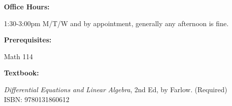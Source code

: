 \documentclass{article}
\theoremstyle{plain}
\theoremstyle{definition}
\theoremstyle{remark}
\begin{document}
\vskip0.1in \noindent
\begin{minipage}[t]{1.2in}
	\textbf{Office Hours:}
\end{minipage}
\begin{minipage}[t]{5.3in}
	1:30-3:00pm M/T/W and by appointment, generally any afternoon is fine.
\end{minipage}

\vskip0.1in \noindent
\begin{minipage}[t]{1.2in}
	\textbf{Prerequisites:}
\end{minipage}
\begin{minipage}[t]{5.3in}
	Math 114
\end{minipage}


\vskip0.1in \noindent
\begin{minipage}[t]{1.2in}
	\textbf{Textbook:}
\end{minipage}
\begin{minipage}[t]{5.3in} 
	\emph{Differential Equations and Linear Algebra}, 2nd Ed, by Farlow.   (Required)\\
ISBN: 9780131860612
\end{minipage}


\end{document}
